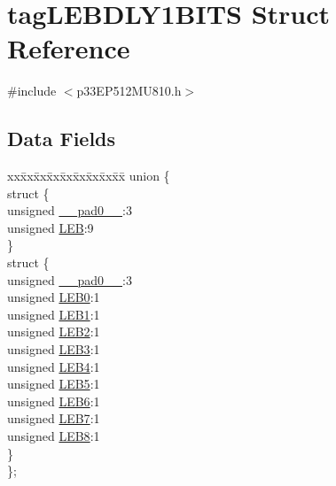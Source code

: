 \hypertarget{structtag_l_e_b_d_l_y1_b_i_t_s}{}\section{tag\+L\+E\+B\+D\+L\+Y1\+B\+I\+TS Struct Reference}
\label{structtag_l_e_b_d_l_y1_b_i_t_s}


{\ttfamily \#include $<$p33\+E\+P512\+M\+U810.\+h$>$}

\subsection*{Data Fields}
\begin{DoxyCompactItemize}
\item 
\begin{tabbing}
xx\=xx\=xx\=xx\=xx\=xx\=xx\=xx\=xx\=\kill
union \{\\
\>struct \{\\
\>\>unsigned \hyperlink{structtag_l_e_b_d_l_y1_b_i_t_s_adf71f3d8410c1f1dbbc96680a92c49af}{\_\_pad0\_\_}:3\\
\>\>unsigned \hyperlink{structtag_l_e_b_d_l_y1_b_i_t_s_a850b96052b17c96a4012653317c39bdf}{LEB}:9\\
\>\} \\
\>struct \{\\
\>\>unsigned \hyperlink{structtag_l_e_b_d_l_y1_b_i_t_s_adf71f3d8410c1f1dbbc96680a92c49af}{\_\_pad0\_\_}:3\\
\>\>unsigned \hyperlink{structtag_l_e_b_d_l_y1_b_i_t_s_a1710dcadd784ef12033a5cf8121accb3}{LEB0}:1\\
\>\>unsigned \hyperlink{structtag_l_e_b_d_l_y1_b_i_t_s_ab0505c0f812822c77a65e8bfe2db4f40}{LEB1}:1\\
\>\>unsigned \hyperlink{structtag_l_e_b_d_l_y1_b_i_t_s_a120826056ccccfac30aa9e8a0569ae88}{LEB2}:1\\
\>\>unsigned \hyperlink{structtag_l_e_b_d_l_y1_b_i_t_s_a7b918c1b7306fd3ff86ab19bcb5365a4}{LEB3}:1\\
\>\>unsigned \hyperlink{structtag_l_e_b_d_l_y1_b_i_t_s_a5fbd877152dfc4182c4456b4224ec747}{LEB4}:1\\
\>\>unsigned \hyperlink{structtag_l_e_b_d_l_y1_b_i_t_s_a4371c46a68a319773f493c25667df943}{LEB5}:1\\
\>\>unsigned \hyperlink{structtag_l_e_b_d_l_y1_b_i_t_s_a2b8fccc4fb31a13c611cfb0d1c53aff0}{LEB6}:1\\
\>\>unsigned \hyperlink{structtag_l_e_b_d_l_y1_b_i_t_s_aa76d586b04119d8459718019ddd964ef}{LEB7}:1\\
\>\>unsigned \hyperlink{structtag_l_e_b_d_l_y1_b_i_t_s_a9b22b47001301c6ae00c3eea0f385091}{LEB8}:1\\
\>\} \\
\}; \\

\end{tabbing}\end{DoxyCompactItemize}


